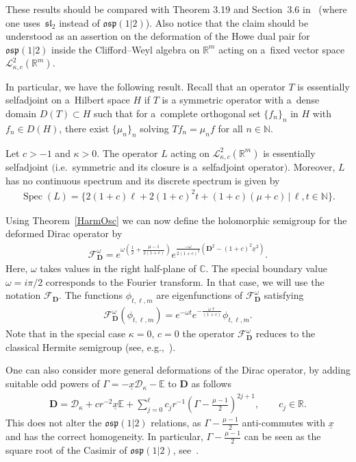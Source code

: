 \documentclass[pdftex]{sigma}
\numberwithin{equation}{section}
\numberwithin{theorem}{section}
\numberwithin{proposition}{section}
\numberwithin{lemma}{section}
\numberwithin{corollary}{section}
\numberwithin{definition}{section}
\numberwithin{example}{section}
\numberwithin{remark}{section}
\numberwithin{note}{section}
\theoremstyle{remark}
\newcommand{\mR}{\mathbb{R}}
\newcommand{\mC}{\mathbb{C}}
\newcommand{\mN}{\mathbb{N}}
\newcommand{\mE}{\mathbb{E}}
\newcommand{\cD}{\mathcal{D}}
\newcommand{\cF}{\mathcal{F}}
\newcommand{\cL}{\mathcal{L}}
\newcommand{\dD}{\textbf{D}}
\newcommand{\ux}{\underline{x}}
\def\k{{\kappa}}
\def\o{{\omega}}
\begin{document}
These results should be compared with Theorem 3.19 and Section~3.6 in~\cite{Orsted2} (where one
uses~$\mathfrak{sl}_{2}$ instead of $\mathfrak{osp}(1|2)$).
Also notice that the claim should be understood as an assertion on the deformation of the Howe dual
pair for $\mathfrak{osp}(1|2)$ inside the Clif\/ford--Weyl algebra on $\mR^{m}$ acting on a~f\/ixed vector
space $\cL^{2}_{\k,c}(\mR^{m})$.

In particular, we have the following result.
Recall that an operator $T$ is essentially selfadjoint on a~Hilbert space $H$ if $T$ is a
symmetric operator with a~dense domain $D(T)\subset H$ such that for a~complete orthogonal set
$\{f_n\}_n$ in $H$ with $f_n\in D(H)$, there exist $\{\mu_n\}_n$ solving $Tf_n=\mu_nf$ for all
$n\in\mN$.
\begin{proposition}
Let $c>-1$ and $\kappa>0$.
The operator $L$ acting on
$\cL^{2}_{\k,c}(\mR^{m})$ is essentially selfadjoint $($i.e.\
symmetric and its closure is a~selfadjoint operator$)$.
Moreover, $L$ has no continuous spectrum and its
discrete spectrum is given by
\begin{gather*}
\operatorname{Spec}(L)=\{2(1+c)\ell+2(1+c)^{2}t+(1+c)(\mu+c)\,|\,\ell,t\in\mN\}.
\end{gather*}
\end{proposition}

Using Theorem~\ref{HarmOsc} we can now def\/ine the holomorphic semigroup for the deformed Dirac
operator by
\begin{gather*}
\cF_{\dD}^{\omega}=e^{\o\left(\frac{1}{2}+\frac{\mu-1}{2(1+c)}\right)}e^{\frac{-\o}{
2(1+c)^{2}}\left(\dD^{2}-(1+c)^{2}\ux^{2}\right)}.
\end{gather*}
Here, $\omega$ takes values in the right half-plane of $\mC$.
The special boundary value $\o=i\pi/2$ corresponds to the Fourier transform.
In that case, we will use the notation $\cF_{\dD}$.
The functions $\phi_{t,\ell,m}$ are eigenfunctions of $\cF_{\dD}^{\omega}$ satisfying
\begin{gather}
\label{eigvalsFourier}
\cF_{\dD}^{\o}(\phi_{t,\ell,m})=e^{-\o t}e^{-\frac{\o\ell}{(1+c)}}\phi_{t,\ell,m}.
\end{gather}
Note that in the special case $\kappa=0$, $c=0$ the operator $\cF_{\dD}^{\omega}$ reduces to the
classical Hermite semigroup (see, e.g.,~\cite{MR0974332}).

\begin{remark}
One can also consider more general deformations of the Dirac operator, by adding suitable odd
powers of $\Gamma=-\ux\cD_{\k}-\mE$ to $\dD$ as follows
\begin{gather*}
\dD=\cD_{\k}+c r^{-2}\ux\mE+\sum_{j=0}^{\ell}c_{j}r^{-1}\left(\Gamma-\frac{\mu-1}{2}
\right)^{2j+1},\qquad c_{j}\in\mR.
\end{gather*}
This does not alter the $\mathfrak{osp}(1|2)$ relations, as $\Gamma-\frac{\mu-1}{2}$
anti-commutes with $\ux$ and has the correct homogeneity.
In particular, $\Gamma-\frac{\mu-1}{2}$ can be seen as the square root of the Casimir of
$\mathfrak{osp}(1|2)$, see~\cite[Example~2 in Section~2.5]{MR1773773}.
\end{remark}
\end{document}
